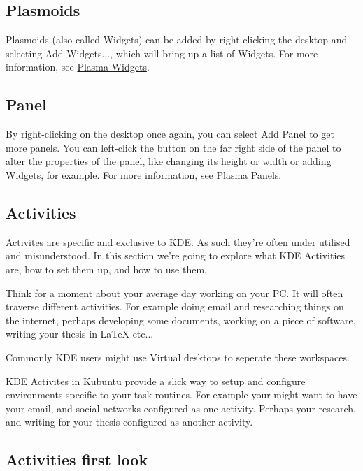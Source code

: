 \documentclass[letterpaper,10pt,english]{sphinxmanual}
\begin{document}
\subsection{Plasmoids}
\label{\detokenize{docs/basic:plasmoids}}
Plasmoids (also called Widgets) can be added by right-clicking the desktop and selecting Add Widgets..., which will bring up a list of Widgets. For more information, see \href{https://userbase.kde.org/Special:MyLanguage/Plasma\#Widgets}{Plasma Widgets}.


\subsection{Panel}
\label{\detokenize{docs/basic:panel}}

By right-clicking on the desktop once again, you can select Add Panel to get more panels. You can left-click the button on the far right side of the panel to alter the properties of the panel, like changing its height or width or adding Widgets, for example. For more information, see \href{https://userbase.kde.org/Special:MyLanguage/Plasma\#Panels}{Plasma Panels}.


\subsection{Activities}
\label{\detokenize{docs/basic:activities}}
Activites are specific and exclusive to KDE. As such they're often under utilised and misunderstood. In this section we're going to explore what KDE Activities are, how to set them up, and how to use them.

Think for a moment about your average day working on your PC. It will often traverse different activities. For example doing email and researching things on the internet, perhaps developing some documents, working on a piece of software, writing your thesis in LaTeX etc...

Commonly KDE users might use Virtual desktops to seperate these workspaces.

KDE Activites in Kubuntu provide a slick way to setup and configure environments specific to your task routines. For example your might want to have your email, and social networks configured as one activity. Perhaps your research, and writing for your thesis configured as another activity.


\subsection{Activities first look}
\label{\detokenize{docs/basic:activities-first-look}}
\end{document}
